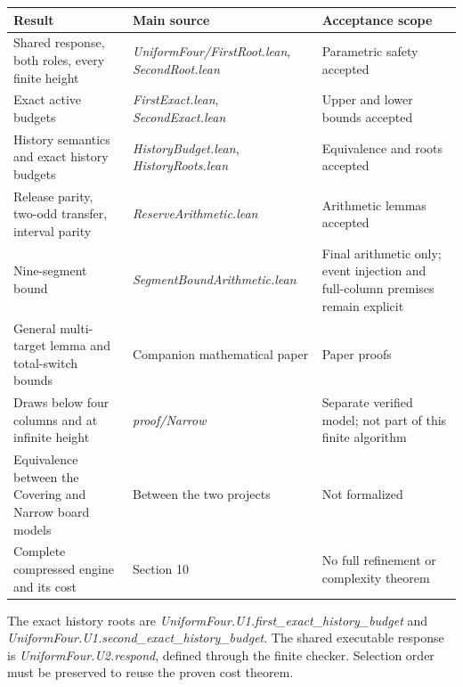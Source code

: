 \documentclass[
  a4paper,
]{article}
\newcounter{none} %
\begin{document}
{\def\LTcaptype{none} %
\begin{longtable}[]{@{}
  >{\raggedright\arraybackslash}p{}
  >{\raggedright\arraybackslash}p{}
  >{\raggedright\arraybackslash}p{}@{}}
\toprule\noalign{}
\begin{minipage}[b]{\linewidth}\raggedright
Result
\end{minipage} & \begin{minipage}[b]{\linewidth}\raggedright
Main source
\end{minipage} & \begin{minipage}[b]{\linewidth}\raggedright
Acceptance scope
\end{minipage} \\
\midrule\noalign{}
\endhead
\bottomrule\noalign{}
\endlastfoot
Shared response, both roles, every finite height &
\emph{UniformFour/FirstRoot.lean}, \emph{SecondRoot.lean} & Parametric
safety accepted \\
Exact active budgets & \emph{FirstExact.lean}, \emph{SecondExact.lean} &
Upper and lower bounds accepted \\
History semantics and exact history budgets & \emph{HistoryBudget.lean},
\emph{HistoryRoots.lean} & Equivalence and roots accepted \\
Release parity, two-odd transfer, interval parity &
\emph{ReserveArithmetic.lean} & Arithmetic lemmas accepted \\
Nine-segment bound & \emph{SegmentBoundArithmetic.lean} & Final
arithmetic only; event injection and full-column premises remain
explicit \\
General multi-target lemma and total-switch bounds & Companion
mathematical paper & Paper proofs \\
Draws below four columns and at infinite height & \emph{proof/Narrow} &
Separate verified model; not part of this finite algorithm \\
Equivalence between the Covering and Narrow board models & Between the
two projects & Not formalized \\
Complete compressed engine and its cost & Section 10 & No full
refinement or complexity theorem \\
\end{longtable}
}

The exact history roots are
\emph{UniformFour.U1.first\_exact\_history\_budget} and
\emph{UniformFour.U1.second\_exact\_history\_budget}. The shared
executable response is \emph{UniformFour.U2.respond}, defined through
the finite checker. Selection order must be preserved to reuse the
proven cost theorem.
\end{document}
